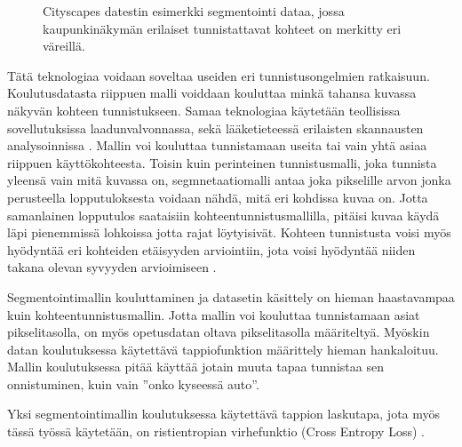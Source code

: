 \begin{figure}[h]
\centering
{}
\caption[Tämä on lyhyt kuvateksti.]{Cityscapes datestin esimerkki segmentointi dataa, jossa kaupunkinäkymän erilaiset tunnistattavat kohteet on merkitty eri väreillä.}
\label{fig:labels}
\end{figure}

Tätä teknologiaa voidaan soveltaa useiden eri tunnistusongelmien ratkaisuun.
Koulutusdatasta riippuen malli voiddaan kouluttaa minkä tahansa kuvassa näkyvän kohteen tunnistukseen.
Samaa teknologiaa käytetään teollisissa sovellutuksissa laadunvalvonnassa,
sekä lääketieteessä erilaisten skannausten analysoinnissa \cite{NagalakshmiT2022BCSS}.
Mallin voi kouluttaa tunnistamaan useita tai vain yhtä asiaa riippuen käyttökohteesta.
Toisin kuin perinteinen tunnistusmalli, joka tunnista yleensä vain mitä kuvassa on,
segmnetaatiomalli antaa joka pikselille arvon jonka perusteella lopputuloksesta voidaan nähdä, mitä eri kohdissa kuvaa on.
Jotta samanlainen lopputulos saataisiin kohteentunnistusmallilla, pitäisi kuvaa käydä läpi pienemmissä lohkoissa jotta rajat löytyisivät.
Kohteen tunnistusta voisi myös hyödyntää eri kohteiden etäisyyden arviointiin, jota voisi hyödyntää niiden takana olevan syvyyden arvioimiseen \cite{ShiZhou2023VRBo}.

Segmentointimallin kouluttaminen ja datasetin käsittely on hieman haastavampaa kuin kohteentunnistusmallin.
Jotta mallin voi kouluttaa tunnistamaan asiat pikselitasolla, on myös opetusdatan oltava pikselitasolla määriteltyä. 
Myöskin datan koulutuksessa käytettävä tappiofunktion määrittely hieman hankaloituu.
Mallin koulutuksessa pitää käyttää jotain muuta tapaa tunnistaa sen onnistuminen, kuin vain ”onko kyseessä auto”.

Yksi segmentointimallin koulutuksessa käytettävä tappion laskutapa, 
jota myös tässä työssä käytetään, on ristientropian virhefunktio (Cross Entropy Loss) \cite{CrossEntropyLoss}. 

